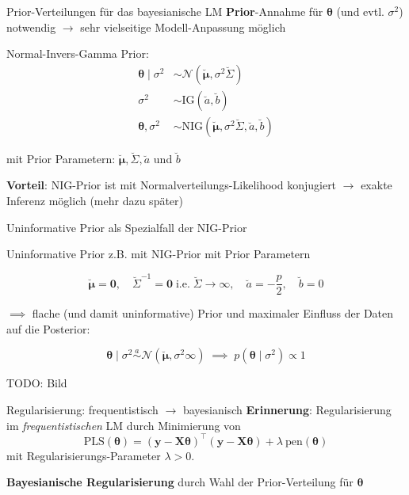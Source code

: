 \documentclass[
  ignorenonframetext,
  aspectratio=169,
]{beamer}
\newcommand{\bnull}{\bm{0}}
\newcommand{\by}{\bm{y}}
\newcommand{\bX}{\bm{X}}
\newcommand{\Ncal}{\mathcal{N}}
\newcommand{\ssd}{\sigma^2}
\newcommand{\btheta}{\bm{\theta}}
\newcommand{\mupri}{\breve{\bm{\mu}}}
\newcommand{\Sdpri}{\breve{\Sigma}}
\newcommand{\Sdipri}{\breve{\Sigma}^{-1}}
\newcommand{\apri}{\breve{a}}
\newcommand{\bpri}{\breve{b}}
\newcommand{\IG}{\text{IG}}
\begin{document}
\begin{frame}{Prior-Verteilungen für das bayesianische LM}
\protect{}\label{prior-verteilungen-fuxfcr-das-bayesianische-lm}
\textbf{Prior}-Annahme für \(\btheta\) (und evtl. \(\ssd\)) notwendig
\(\to\) sehr vielseitige Modell-Anpassung möglich

\begin{block}{Normal-Invers-Gamma Prior:}
\protect{}\label{normal-invers-gamma-prior}
\[
\begin{aligned}
  \btheta \mid \ssd &\sim  \Ncal(\mupri, \ssd \Sdpri) \\
  \ssd &\sim \IG(\apri, \bpri) \\
  \btheta, \ssd &\sim \text{NIG}(\mupri, \ssd \Sdpri, \apri, \bpri)
\end{aligned}
\]

mit Prior Parametern: \(\mupri, \Sdpri, \apri\) und \(\bpri\)
\end{block}

\textbf{Vorteil}: NIG-Prior ist mit Normalverteilungs-Likelihood
konjugiert \(\to\) exakte Inferenz möglich (mehr dazu später)
\end{frame}

\begin{frame}{Uninformative Prior als Spezialfall der NIG-Prior}
\protect{}\label{uninformative-prior-als-spezialfall-der-nig-prior}
\begin{block}{Uninformative Prior}
\protect{}\label{uninformative-prior}
z.B. mit NIG-Prior mit Prior Parametern

\[
\mupri = \bnull, \quad \Sdipri = \bnull \; \text{i.e.}\; \Sdpri \to \infty, \quad \apri = - \frac{p}{2}, \quad \bpri = 0
\]

\(\implies\) flache (und damit uninformative) Prior und maximaler
Einfluss der Daten auf die Posterior:

\[
\btheta \mid \ssd \overset{a}{\sim}  \Ncal(\mupri, \ssd \infty) \; \implies \; p(\btheta\mid \ssd) \propto 1
\]
\end{block}

TODO: Bild
\end{frame}

\begin{frame}{Regularisierung: frequentistisch \(\to\) bayesianisch}
\protect{}\label{regularisierung-frequentistisch-to-bayesianisch}
\textbf{Erinnerung}: Regularisierung im \emph{frequentistischen} LM
durch Minimierung von
\[\text{PLS}(\btheta) = (\by - \bX \btheta)^\top (\by - \bX \btheta) + \lambda \ \text{pen}(\btheta)\]
mit Regularisierungs-Parameter \(\lambda > 0\).

\textbf{Bayesianische Regularisierung} durch Wahl der Prior-Verteilung
für \(\btheta\)
\end{frame}
\end{document}
